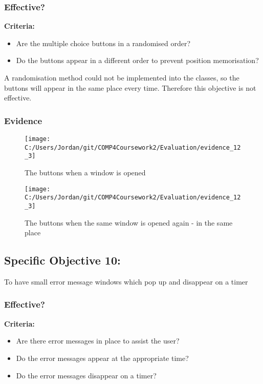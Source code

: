 \subsubsection{Effective?}

\textbf{Criteria: }

\begin{itemize}
	\item Are the multiple choice buttons in a randomised order?
	\item Do the buttons appear in a different order to prevent position memorisation?
\end{itemize}

A randomisation method could not be implemented into the classes, so the buttons will appear in the same place every time. Therefore this objective is not effective.

\subsubsection{Evidence}

\begin{figure}[H]
	\texttt{[image: C:/Users/Jordan/git/COMP4Coursework2/Evaluation/evidence\_12\_3]}
	\caption{The buttons when a window is opened}
\end{figure}

\begin{figure}[H]
	\texttt{[image: C:/Users/Jordan/git/COMP4Coursework2/Evaluation/evidence\_12\_3]}
	\caption{The buttons when the same window is opened again - in the same place}
\end{figure}

\subsection{Specific Objective 10: }

To have small error message windows which pop up and disappear on a timer

\subsubsection{Effective?}

\textbf{Criteria: }

\begin{itemize}
	\item Are there error messages in place to assist the user?
	\item Do the error messages appear at the appropriate time?
	\item Do the error messages disappear on a timer?
\end{itemize}

